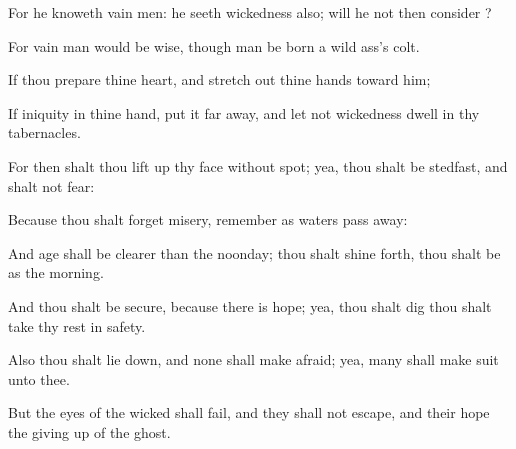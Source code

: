 {For he
knoweth
vain
men: he
seeth
wickedness also; will he not then
consider
{}?

For
vain
man would be
wise, though
man be
born
{} a wild
ass’s
colt.


\par }{\PP {}If thou
prepare thine
heart, and
stretch out thine
hands toward him;

If
iniquity
{} in thine
hand, put it far
away, and let not
wickedness
dwell in thy
tabernacles.

For then shalt thou lift
up thy
face without
spot; yea, thou shalt be
stedfast, and shalt not
fear:

Because thou shalt
forget
{}
misery,
{}
remember
{} as
waters
{} pass
away:

And
{}
age shall be
clearer than the
noonday; thou shalt shine
forth, thou shalt be as the
morning.

And thou shalt be
secure, because there
is
hope; yea, thou shalt
dig
{} thou shalt take thy
rest in
safety.

Also thou shalt lie
down, and none shall make
{}
afraid; yea,
many shall make
suit unto
thee.

But the
eyes of the
wicked shall
fail, and they shall not
escape, and their
hope
{} the giving
up of the
ghost.




\par }
